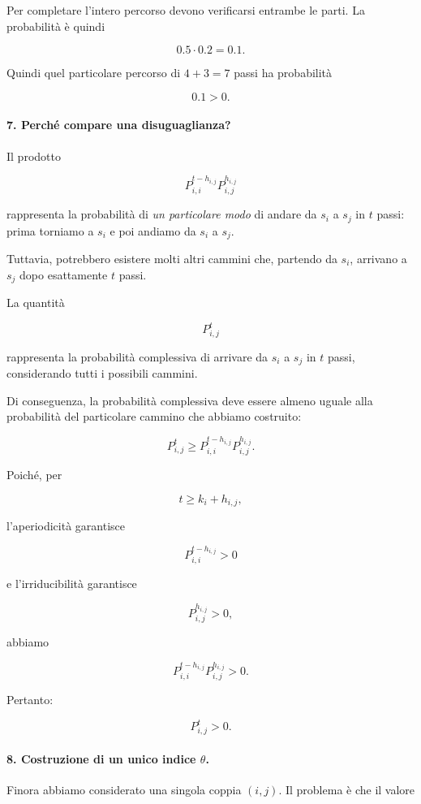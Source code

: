 Per completare l'intero percorso devono verificarsi entrambe le parti. La probabilità è quindi

$$
0.5\cdot0.2=0.1.
$$

Quindi quel particolare percorso di $4+3=7$ passi ha probabilità

$$
0.1>0.
$$


\paragraph{7. Perché compare una disuguaglianza?}

Il prodotto

$$
P^{t-h_{i,j}}_{i,i}
P^{h_{i,j}}_{i,j}
$$

rappresenta la probabilità di \emph{un particolare modo} di andare da $s_i$ a $s_j$ in $t$ passi: prima torniamo a $s_i$ e poi andiamo da $s_i$ a $s_j$.

Tuttavia, potrebbero esistere molti altri cammini che, partendo da $s_i$, arrivano a $s_j$ dopo esattamente $t$ passi.

La quantità

$$
P^t_{i,j}
$$

rappresenta la probabilità complessiva di arrivare da $s_i$ a $s_j$ in $t$ passi, considerando tutti i possibili cammini.

Di conseguenza, la probabilità complessiva deve essere almeno uguale alla probabilità del particolare cammino che abbiamo costruito:

$$
\boxed{
P^t_{i,j}
\geq
P^{t-h_{i,j}}_{i,i}
P^{h_{i,j}}_{i,j}.
}
$$

Poiché, per

$$
t\geq k_i+h_{i,j},
$$

l'aperiodicità garantisce

$$
P^{t-h_{i,j}}_{i,i}>0
$$

e l'irriducibilità garantisce

$$
P^{h_{i,j}}_{i,j}>0,
$$

abbiamo

$$
P^{t-h_{i,j}}_{i,i}
P^{h_{i,j}}_{i,j}>0.
$$

Pertanto:

$$
\boxed{
P^t_{i,j}>0.
}
$$

\paragraph{8. Costruzione di un unico indice $\theta$.}

Finora abbiamo considerato una singola coppia $(i,j)$. Il problema è che il valore


